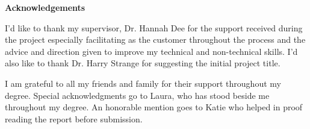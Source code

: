 \thispagestyle{empty}

\begin{center}
    {\LARGE\bf Acknowledgements}
\end{center}

I'd like to thank my supervisor, Dr. Hannah Dee for the support received during the project especially facilitating as the customer throughout the process and the advice and direction given to improve my technical and non-technical skills. I'd also like to thank Dr. Harry Strange for suggesting the initial project title.

I am grateful to all my friends and family for their support throughout my degree. Special acknowledgments go to Laura, who has stood beside me throughout my degree. An honorable mention goes to Katie who helped in proof reading the report before submission.
